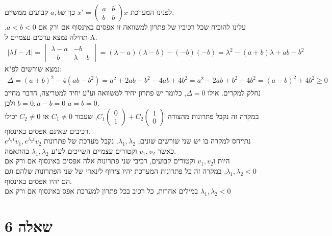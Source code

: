 \documentclass{article}
\begin{document}
לפנינו המערכת $x'=\begin{pmatrix}
        a & b \\
        b & b
    \end{pmatrix}x$ כך ש$a,b$ קבועים ממשיים.\\
עלינו להוכיח שכל רכיביו של פתרון למשוואה זו אפסים באינסוף אם ורק אם $a<b<0$. תחילה נמצא ערכים עצמיים ל-A.
\begin{align*}
    |\lambda I - A|=\begin{vmatrix}
                        \lambda-a & -b        \\
                        -b        & \lambda-b
                    \end{vmatrix}=(\lambda-a)(\lambda-b)-(-b)(-b)=\lambda^2-(a+b)\lambda+ab-b^2
\end{align*}
נמצא שורשים לפ"א:
\begin{align*}
    \Delta=(a+b)^2-4(ab-b^2)=a^2+2ab+b^2-4ab+4b^2=a^2-2ab+b^2+4b^2=(a-b)^2+4b^2\geq 0
\end{align*}
נחלק למקרים. אילו $\Delta=0$, כלומר יש פתרון יחיד למשוואה וע"ע יחיד למטריצה, הדבר מחייב $b=0, a-b=0$ ולכן $a=b=0$.\\
במקרה זה נקבל פתרונות מהצורה $C_1\begin{pmatrix}
        0 \\
        1
    \end{pmatrix}+C_2\begin{pmatrix}
        1 \\
        0
    \end{pmatrix}$, שעבור $C_1\ne 0$ או $C_2\ne 0$ יכילו רכיבים שאינם אפסים באינסוף.\\
נתייחס למקרה בו יש שני שורשים שונים, $\lambda_1, \lambda_2$. נקבל מערכת של פתרונות $e^{\lambda_1t}v_1, e^{\lambda_2t}v_2$ כאשר $v_1, v_2$ וקטורים עצמיים השייכים לע"ע $\lambda_1, \lambda_2$ בהתאמה.\\
היות ו$v_1, v_2$ וקטורים קבועים, רכיבי שני פתרונות אלה אפסים באינסוף אם ורק אם $\lambda_1, \lambda_2<0$. במקרה זה כל פתרונות המערכת יהיו צירוף לינארי של שני הפתרונות שלהם וגם הם יהיו אפסים באינסוף.\\
במילים אחרות, כל רכיב בכל פתרון למערכת אפס באינסוף אם ורק אם $\lambda_1, \lambda_2<0$

\pagebreak

\section*{שאלה 6}
\end{document}
